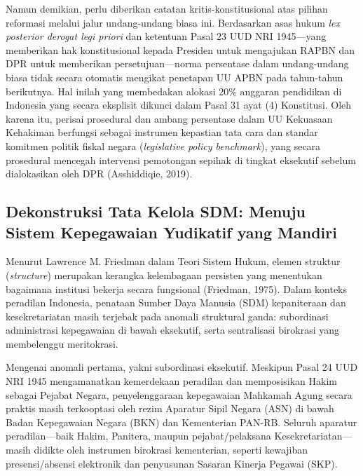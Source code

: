 \documentclass[12pt, a4paper]{article}
\begin{document}
Namun demikian, perlu diberikan catatan kritis-konstitusional atas pilihan reformasi melalui jalur undang-undang biasa ini. Berdasarkan asas hukum \textit{lex posterior derogat legi priori} dan ketentuan Pasal 23 UUD NRI 1945—yang memberikan hak konstitusional kepada Presiden untuk mengajukan RAPBN dan DPR untuk memberikan persetujuan—norma persentase dalam undang-undang biasa tidak secara otomatis mengikat penetapan UU APBN pada tahun-tahun berikutnya. Hal inilah yang membedakan alokasi 20\% anggaran pendidikan di Indonesia yang secara eksplisit dikunci dalam Pasal 31 ayat (4) Konstitusi. Oleh karena itu, perisai prosedural dan ambang persentase dalam UU Kekuasaan Kehakiman berfungsi sebagai instrumen kepastian tata cara dan standar komitmen politik fiskal negara (\textit{legislative policy benchmark}), yang secara prosedural mencegah intervensi pemotongan sepihak di tingkat eksekutif sebelum dialokasikan oleh DPR (Asshiddiqie, 2019).

\subsection{Dekonstruksi Tata Kelola SDM: Menuju Sistem Kepegawaian Yudikatif yang Mandiri}

Menurut Lawrence M. Friedman dalam Teori Sistem Hukum, elemen struktur (\textit{structure}) merupakan kerangka kelembagaan persisten yang menentukan bagaimana institusi bekerja secara fungsional (Friedman, 1975). Dalam konteks peradilan Indonesia, penataan Sumber Daya Manusia (SDM) kepaniteraan dan kesekretariatan masih terjebak pada anomali struktural ganda: subordinasi administrasi kepegawaian di bawah eksekutif, serta sentralisasi birokrasi yang membelenggu meritokrasi.

Mengenai anomali pertama, yakni subordinasi eksekutif. Meskipun Pasal 24 UUD NRI 1945 mengamanatkan kemerdekaan peradilan dan memposisikan Hakim sebagai Pejabat Negara, penyelenggaraan kepegawaian Mahkamah Agung secara praktis masih terkooptasi oleh rezim Aparatur Sipil Negara (ASN) di bawah Badan Kepegawaian Negara (BKN) dan Kementerian PAN-RB. Seluruh aparatur peradilan—baik Hakim, Panitera, maupun pejabat/pelaksana Kesekretariatan—masih didikte oleh instrumen birokrasi kementerian, seperti kewajiban presensi/absensi elektronik dan penyusunan Sasaran Kinerja Pegawai (SKP). 
\end{document}
